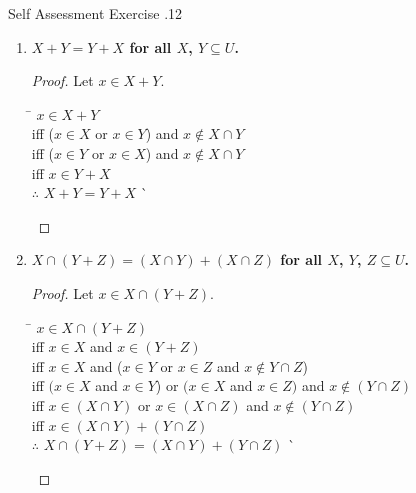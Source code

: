 \documentclass[../notes.tex]{subfiles}
\begin{document}
\begin{exercise}{Self Assessment Exercise \thechapter.12}
\begin{enumerate}
						\begin{enumerate}[label=(\alph*)]
							\item \textbf{$X + Y = Y + X$ for all $X$, $Y \subseteq U$.}
								\begin{proof}
									Let $x \in X + Y$.
									\begin{tabbing}
										\qquad \= $x \in X + Y$\\
										iff \> ($x \in X$ or $x \in Y$) and $x \notin X \cap Y$\\
										iff \> ($x \in Y$ or $x \in X$) and $x \notin X \cap Y$\\
										iff \> $x \in Y + X$\\
										$\therefore$ \> $X + Y = Y + X$ \` \qedhere
									\end{tabbing}
								\end{proof}
							\item \textbf{$X \cap (Y + Z) = (X \cap Y) + (X \cap Z)$ for all $X$, $Y$, $Z \subseteq U$.}
								\begin{proof}
									Let $x \in X \cap (Y + Z)$.
									\begin{tabbing}
										\qquad \= $x \in X \cap (Y + Z)$\\
										iff \> $x \in X$ and $x \in (Y + Z)$\\
										iff \> $x \in X$ and ($x \in Y$ or $x \in Z$ and $x \notin Y \cap Z$)\\
										iff \> $(x \in X$ and $x \in Y$) or $(x \in X$ and $x \in Z)$ and $x \notin (Y \cap Z)$\\
										iff \> $x \in (X \cap Y)$ or $x \in (X \cap Z)$ and $x \notin (Y \cap Z)$\\
										iff \> $x \in (X \cap Y) + (Y \cap Z)$\\
										$\therefore$ \> $X \cap (Y + Z) = (X \cap Y) + (Y \cap Z)$ \` \qedhere
									\end{tabbing}
								\end{proof}
						\end{enumerate}
				\end{enumerate}
			\end{exercise}
\end{document}
